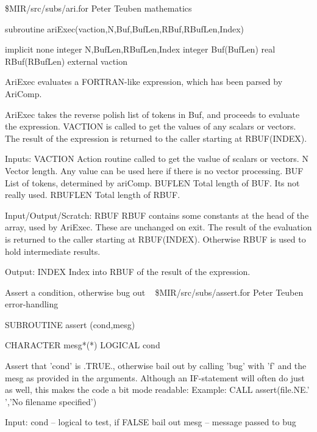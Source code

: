 \newline {} \$MIR/src/subs/ari.for
\newline {} Peter Teuben
\newline {} mathematics
\par{\tenpoint
{\eightpoint\begintt
        subroutine ariExec(vaction,N,Buf,BufLen,RBuf,RBufLen,Index)

        implicit none
        integer N,BufLen,RBufLen,Index
        integer Buf(BufLen)
        real RBuf(RBufLen)
        external vaction

  AriExec evaluates a FORTRAN-like expression, which has been parsed
  by AriComp.

  AriExec takes the reverse polish list of tokens in Buf, and proceeds
  to evaluate the expression. VACTION is called to get the values of
  any scalars or vectors. The result of the expression is returned to
  the caller starting at RBUF(INDEX).

  Inputs:
    VACTION    Action routine called to get the vaslue of scalars or vectors.
    N          Vector length. Any value can be used here if there is
               no vector processing.
    BUF        List of tokens, determined by ariComp.
    BUFLEN     Total length of BUF. Its not really used.
    RBUFLEN    Total length of RBUF.

  Input/Output/Scratch:
    RBUF       RBUF contains some constants at the head of the
               array, used by AriExec. These are unchanged on exit.
               The result of the evaluation is returned to the caller
               starting at RBUF(INDEX). Otherwise RBUF is used to hold
               intermediate results.

  Output:
    INDEX      Index into RBUF of the result of the expression.
\endtt}
\par}
%
\noindent Assert a condition, otherwise bug out
\newline \ 
\newline {} \$MIR/src/subs/assert.for
\newline {} Peter Teuben
\newline {} error-handling
\par{\tenpoint
{\eightpoint\begintt
        SUBROUTINE assert (cond,mesg)

        CHARACTER mesg*(*)
        LOGICAL   cond

   Assert that 'cond' is .TRUE., otherwise bail out by calling
   'bug' with 'f' and the mesg as provided in the arguments.
   Although an IF-statement will often do just as well, this makes
   the code a bit mode readable:
   Example:
       CALL assert(file.NE.' ','No filename specified')

   Input:
       cond    -- logical to test, if FALSE bail out
       mesg    -- message passed to bug
\endtt}
\par}
